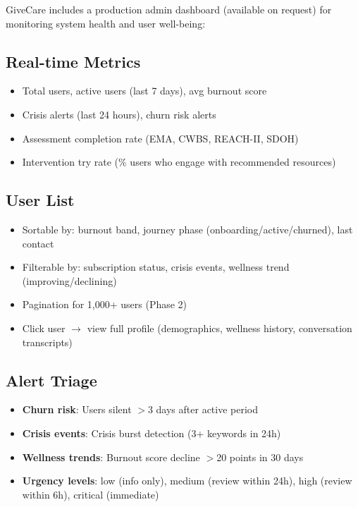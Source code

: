 \documentclass{article}
\begin{document}
GiveCare includes a production admin dashboard (available on request) for monitoring system health and user well-being:

\subsection*{Real-time Metrics}
\begin{itemize}
    \item Total users, active users (last 7 days), avg burnout score
    \item Crisis alerts (last 24 hours), churn risk alerts
    \item Assessment completion rate (EMA, CWBS, REACH-II, SDOH)
    \item Intervention try rate (\% users who engage with recommended resources)
\end{itemize}

\subsection*{User List}
\begin{itemize}
    \item Sortable by: burnout band, journey phase (onboarding/active/churned), last contact
    \item Filterable by: subscription status, crisis events, wellness trend (improving/declining)
    \item Pagination for 1,000+ users (Phase 2)
    \item Click user $\rightarrow$ view full profile (demographics, wellness history, conversation transcripts)
\end{itemize}

\subsection*{Alert Triage}
\begin{itemize}
    \item \textbf{Churn risk}: Users silent $>$3 days after active period
    \item \textbf{Crisis events}: Crisis burst detection (3+ keywords in 24h)
    \item \textbf{Wellness trends}: Burnout score decline $>$20 points in 30 days
    \item \textbf{Urgency levels}: low (info only), medium (review within 24h), high (review within 6h), critical (immediate)
\end{itemize}
\end{document}
